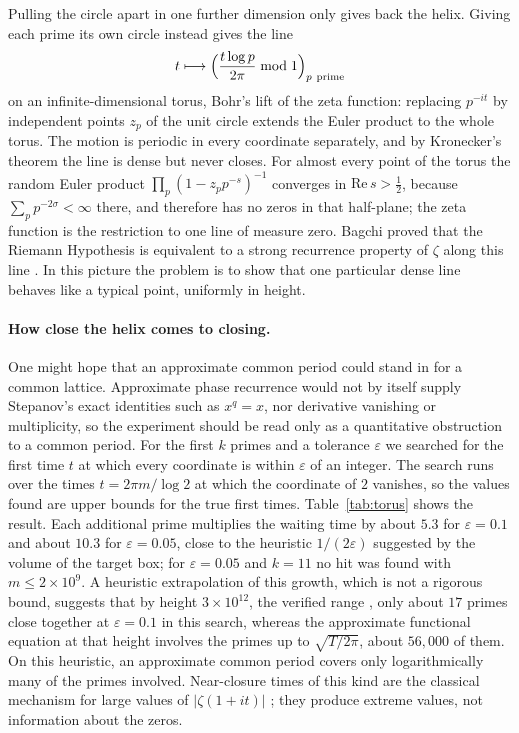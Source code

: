 \documentclass[11pt,a4paper]{article}
\theoremstyle{definition}\newtheorem{definition}[proposition]{Definition}
\theoremstyle{remark}\newtheorem{remark}[proposition]{Remark}
\begin{document}
Pulling the circle apart in one further dimension only gives back the helix. Giving each prime its own circle instead gives the line
\[
t\longmapsto\Bigl(\frac{t\log p}{2\pi}\bmod1\Bigr)_{p\ \mathrm{prime}}
\]
on an infinite-dimensional torus, Bohr's lift of the zeta function: replacing $p^{-it}$ by independent points $z_p$ of the unit circle extends the Euler product to the whole torus. The motion is periodic in every coordinate separately, and by Kronecker's theorem the line is dense but never closes. For almost every point of the torus the random Euler product $\prod_p(1-z_pp^{-s})^{-1}$ converges in $\mathrm{Re}\,s>\tfrac12$, because $\sum_pp^{-2\sigma}<\infty$ there, and therefore has no zeros in that half-plane; the zeta function is the restriction to one line of measure zero. Bagchi proved that the Riemann Hypothesis is equivalent to a strong recurrence property of $\zeta$ along this line \cite{Bagchi1987}. In this picture the problem is to show that one particular dense line behaves like a typical point, uniformly in height.

\paragraph{How close the helix comes to closing.} One might hope that an approximate common period could stand in for a common lattice. Approximate phase recurrence would not by itself supply Stepanov's exact identities such as $x^q=x$, nor derivative vanishing or multiplicity, so the experiment should be read only as a quantitative obstruction to a common period. For the first $k$ primes and a tolerance $\varepsilon$ we searched for the first time $t$ at which every coordinate is within $\varepsilon$ of an integer. The search runs over the times $t=2\pi m/\log2$ at which the coordinate of $2$ vanishes, so the values found are upper bounds for the true first times. Table~\ref{tab:torus} shows the result. Each additional prime multiplies the waiting time by about $5.3$ for $\varepsilon=0.1$ and about $10.3$ for $\varepsilon=0.05$, close to the heuristic $1/(2\varepsilon)$ suggested by the volume of the target box; for $\varepsilon=0.05$ and $k=11$ no hit was found with $m\le2\times10^9$. A heuristic extrapolation of this growth, which is not a rigorous bound, suggests that by height $3\times10^{12}$, the verified range \cite{PlattTrudgian2021}, only about $17$ primes close together at $\varepsilon=0.1$ in this search, whereas the approximate functional equation at that height involves the primes up to $\sqrt{T/2\pi}$, about $56{,}000$ of them. On this heuristic, an approximate common period covers only logarithmically many of the primes involved. Near-closure times of this kind are the classical mechanism for large values of $|\zeta(1+it)|$ \cite{Titchmarsh1986}; they produce extreme values, not information about the zeros.
\end{document}
